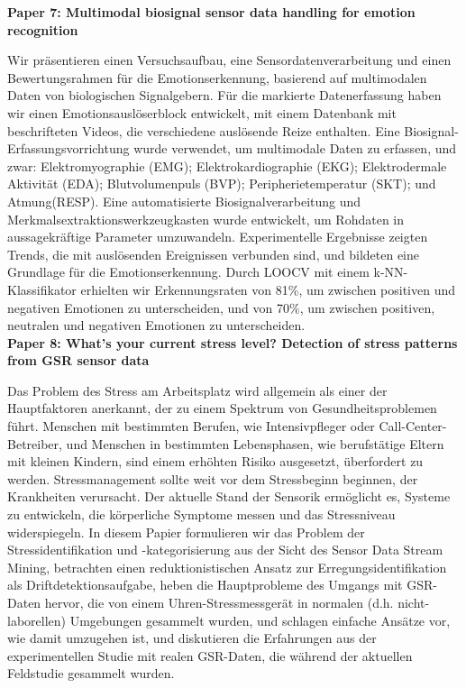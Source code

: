 \textbf{Paper 7: Multimodal biosignal sensor data handling for emotion recognition}

Wir präsentieren einen Versuchsaufbau, eine Sensordatenverarbeitung und einen Bewertungsrahmen für die Emotionserkennung, basierend auf multimodalen Daten von biologischen Signalgebern.  
Für die markierte Datenerfassung haben wir einen Emotionsauslöserblock entwickelt, mit einem Datenbank mit beschrifteten Videos, die verschiedene auslösende Reize enthalten. 
Eine Biosignal-Erfassungsvorrichtung wurde verwendet, um multimodale Daten zu erfassen, und zwar: 
Elektromyographie (EMG); Elektrokardiographie (EKG); Elektrodermale Aktivität (EDA); Blutvolumenpuls (BVP); Peripherietemperatur (SKT); und Atmung(RESP). 
Eine automatisierte Biosignalverarbeitung und Merkmalsextraktionswerkzeugkasten wurde entwickelt, um Rohdaten in aussagekräftige Parameter umzuwandeln. 
Experimentelle Ergebnisse zeigten Trends, die mit auslösenden Ereignissen verbunden sind, und bildeten eine Grundlage für die Emotionserkennung. 
Durch LOOCV mit einem k-NN-Klassifikator erhielten wir Erkennungsraten von 81\%, um zwischen positiven und negativen Emotionen zu unterscheiden, und von 70\%, um zwischen positiven, neutralen und negativen Emotionen zu unterscheiden. \\


\textbf{Paper 8: What’s your current stress level? Detection of stress patterns from GSR sensor data}

Das Problem des Stress am Arbeitsplatz wird allgemein als einer der Hauptfaktoren anerkannt, der zu einem Spektrum von Gesundheitsproblemen führt. 
Menschen mit bestimmten Berufen, wie Intensivpfleger oder Call-Center-Betreiber, und Menschen in bestimmten Lebensphasen, wie berufstätige Eltern mit kleinen Kindern, sind einem erhöhten Risiko ausgesetzt, überfordert zu werden. 
Stressmanagement sollte weit vor dem Stressbeginn beginnen, der Krankheiten verursacht. 
Der aktuelle Stand der Sensorik ermöglicht es, Systeme zu entwickeln, die körperliche Symptome messen und das Stressniveau widerspiegeln. 
In diesem Papier formulieren wir das Problem der Stressidentifikation und -kategorisierung aus der Sicht des Sensor Data Stream Mining, betrachten einen reduktionistischen Ansatz zur Erregungsidentifikation als Driftdetektionsaufgabe, heben die Hauptprobleme des Umgangs mit GSR-Daten hervor, die von einem Uhren-Stressmessgerät in normalen (d.h. nicht-laborellen) Umgebungen gesammelt wurden, und schlagen einfache Ansätze vor, wie damit umzugehen ist, und diskutieren die Erfahrungen aus der experimentellen Studie mit realen GSR-Daten, die während der aktuellen Feldstudie gesammelt wurden. \\



